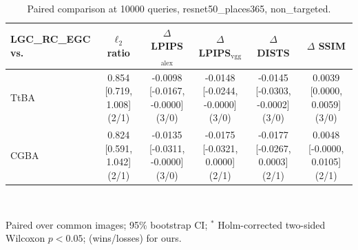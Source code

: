 \begin{table}[t]
\centering\footnotesize
\caption{Paired comparison at 10000 queries, resnet50\_places365, non\_targeted.}
\begin{tabular}{lccccc}
\toprule
LGC\_RC\_EGC vs. & $\ell_2$ ratio & $\Delta$ LPIPS$_{\mathrm{alex}}$ & $\Delta$ LPIPS$_{\mathrm{vgg}}$ & $\Delta$ DISTS & $\Delta$ SSIM \\
\midrule
TtBA & 0.854 [0.719, 1.008] (2/1) & -0.0098 [-0.0167, -0.0000] (3/0) & -0.0148 [-0.0244, -0.0000] (3/0) & -0.0145 [-0.0303, -0.0002] (3/0) & 0.0039 [0.0000, 0.0059] (3/0) \\
CGBA & 0.824 [0.591, 1.042] (2/1) & -0.0135 [-0.0311, -0.0000] (3/0) & -0.0175 [-0.0321, 0.0000] (2/1) & -0.0177 [-0.0267, 0.0003] (2/1) & 0.0048 [-0.0000, 0.0105] (2/1) \\
\bottomrule
\end{tabular}
\\[2pt]\parbox{\linewidth}{\scriptsize Paired over common images; 95\% bootstrap CI; $^{*}$ Holm-corrected two-sided Wilcoxon $p<0.05$; (wins/losses) for ours.}
\end{table}
